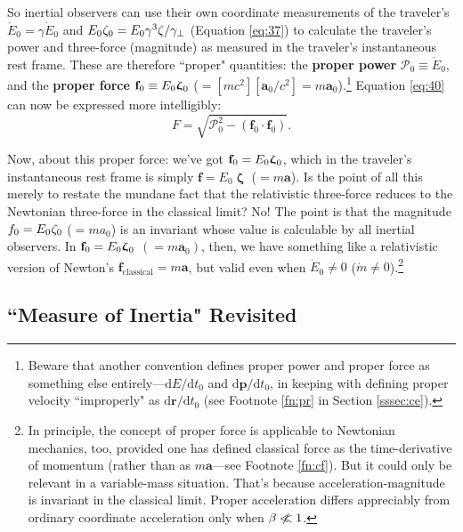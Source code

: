 \documentclass[12pt]{article}
\renewcommand{\vv}[1]{\mathbf{#1}}
\newcommand{\dd}[1]{\mathrm{d}#1}
\newcommand{\vvzeta}{\bm{\upzeta}}
\begin{document}
So inertial observers can use their own coordinate measurements of the traveler's $\mathring{E}_0 = \gamma \dot{E}_0$ and $E_0 \mkern.5mu \zeta_0 = E_0 \gamma^3 \zeta / \gamma_{\perp}$ (Equation \ref{eq:37}) to calculate the traveler's power and three-force (magnitude) as measured in the traveler's instantaneous rest frame. These are therefore ``proper" quantities: the \textbf{proper power} $\mathcal{P}_0 \equiv \mathring{E}_0$, and the \textbf{proper force} $\vv f_0 \equiv E_0 \vvzeta_{\mkern1mu 0}$ ($= [mc^2][\vv a_0 / c^2] = m \vv a_0$).\footnote{Beware that another convention defines proper power and proper force as something else entirely---$\dd E / \dd t_0$ and $\dd \vv p / \dd t_0$, in keeping with defining proper velocity ``improperly" as $\dd \vv r / \dd t_0$ (see Footnote \ref{fn:pr} in Section \ref{sssec:ce}).} Equation \ref{eq:40} can now be expressed more intelligibly:
\begin{equation}\label{eq:42}
F = \sqrt{\mathcal{P}_0^2 - (\vv f_0 \cdot \vv f_0)} .
\end{equation}

Now, about this proper force: we've got $\vv f_0 = E_0 \vvzeta_{\mkern1mu 0}$, which in the traveler's instantaneous rest frame is simply $\vv f = E_0 \vvzeta$ ($= m \vv a$). Is the point of all this merely to restate the mundane fact that the relativistic three-force reduces to the Newtonian three-force in the classical limit? No! The point is that the magnitude $f_0 = E_0 \mkern.5mu \zeta_0$ ($= m a_0$) is an invariant whose value is calculable by all inertial observers. In $\vv f_0 = E_0 \vvzeta_{\mkern1mu 0}$ $(= m \vv a_0)$, then, we have something like a relativistic version of Newton's $\vv f_{\mathrm{classical}} = m \vv a$, but valid even when $\dot{E}_0 \neq 0$ ($\dot{m} \neq 0$).\footnote{In principle, the concept of proper force is applicable to Newtonian mechanics, too, provided one has defined classical force as the time-derivative of momentum (rather than as $m \vv a$---see Footnote \ref{fn:cf}). But it could only be relevant in a variable-mass situation. That's because acceleration-magnitude is invariant in the classical limit. Proper acceleration differs appreciably from ordinary coordinate acceleration only when $\beta \centernot{\ll} 1$.}


\subsection["Measure of Inertia" Revisited]{``Measure of Inertia" Revisited}\label{ssec:in}
\end{document}
